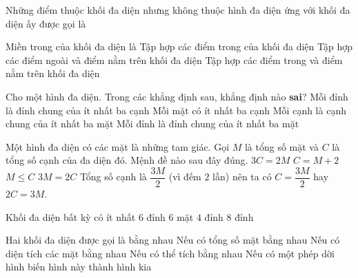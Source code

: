 \begin{ex}%
	Những điểm thuộc khối đa diện nhưng không thuộc hình đa diện ứng với khối đa diện ấy được gọi là
\end{ex}

\begin{ex}%
	Miền trong của khối đa diện là
	{\True Tập hợp các điểm trong của khối đa diện}
	{Tập hợp các điểm ngoài và điểm nằm trên khối đa diện}
	{Tập hợp các điểm trong và điểm nằm trên khối đa diện}
\end{ex}

\begin{ex}%
	Cho một hình đa diện. Trong các khẳng định sau, khẳng định nào \textbf{sai}?
	\choice
	{Mỗi đỉnh là đỉnh chung của ít nhất ba cạnh}
	{Mỗi mặt có ít nhất ba cạnh}
	{\True Mỗi cạnh là cạnh chung của ít nhất ba mặt}
	{Mỗi đỉnh là đỉnh chung của ít nhất ba mặt}
	\loigiai
	{
		
	}
\end{ex}
\begin{ex}%
	Một hình đa diện có các mặt là những tam giác. Gọi  $M$ là tổng số mặt và  $C$ là tổng số cạnh của đa diện đó. Mệnh đề nào sau đây đúng.
	\choice
	{$3C=2M$ }
	{$C=M+2$ }
	{$M \leq C$ }
	{\True $3M=2C$ }
	\loigiai
	{
		Tổng số cạnh là $\dfrac{3M}{2}$ (vì đếm $2$ lần) nên ta có $C=\dfrac{3M}{2}$ hay $2C=3M$.
	}
\end{ex}
\begin{ex}%
	Khối đa diện bất kỳ có ít nhất
	\choice
	{$6$ đỉnh}
	{$6$ mặt}
	{\True $4$ đỉnh}
	{$8$ đỉnh}
	\loigiai{
		
	}
\end{ex}
\begin{ex}%
	Hai khối đa diện được gọi là bằng nhau
	\choice
	{Nếu có tổng số mặt bằng nhau}
	{Nếu có diện tích các mặt bằng nhau}
	{Nếu có thể tích bằng nhau}
	{\True Nếu có một phép dời hình biến hình này thành hình kia}
	\loigiai
	{
		
	}
\end{ex}
